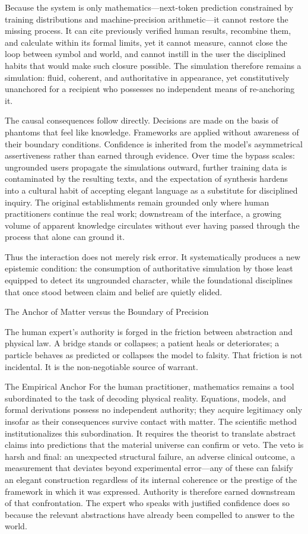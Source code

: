 Because the system is only mathematics—next-token prediction constrained by training distributions and machine-precision arithmetic—it cannot restore the missing process. It can cite previously verified human results, recombine them, and calculate within its formal limits, yet it cannot measure, cannot close the loop between symbol and world, and cannot instill in the user the disciplined habits that would make such closure possible. The simulation therefore remains a simulation: fluid, coherent, and authoritative in appearance, yet constitutively unanchored for a recipient who possesses no independent means of re-anchoring it.

The causal consequences follow directly. Decisions are made on the basis of phantoms that feel like knowledge. Frameworks are applied without awareness of their boundary conditions. Confidence is inherited from the model’s asymmetrical assertiveness rather than earned through evidence. Over time the bypass scales: ungrounded users propagate the simulations outward, further training data is contaminated by the resulting texts, and the expectation of synthesis hardens into a cultural habit of accepting elegant language as a substitute for disciplined inquiry. The original establishments remain grounded only where human practitioners continue the real work; downstream of the interface, a growing volume of apparent knowledge circulates without ever having passed through the process that alone can ground it.

Thus the interaction does not merely risk error. It systematically produces a new epistemic condition: the consumption of authoritative simulation by those least equipped to detect its ungrounded character, while the foundational disciplines that once stood between claim and belief are quietly elided.

The Anchor of Matter versus the Boundary of Precision

The human expert’s authority is forged in the friction between abstraction and physical law. A bridge stands or collapses; a patient heals or deteriorates; a particle behaves as predicted or collapses the model to falsity. That friction is not incidental. It is the non-negotiable source of warrant.

The Empirical Anchor
For the human practitioner, mathematics remains a tool subordinated to the task of decoding physical reality. Equations, models, and formal derivations possess no independent authority; they acquire legitimacy only insofar as their consequences survive contact with matter. The scientific method institutionalizes this subordination. It requires the theorist to translate abstract claims into predictions that the material universe can confirm or veto. The veto is harsh and final: an unexpected structural failure, an adverse clinical outcome, a measurement that deviates beyond experimental error—any of these can falsify an elegant construction regardless of its internal coherence or the prestige of the framework in which it was expressed. Authority is therefore earned downstream of that confrontation. The expert who speaks with justified confidence does so because the relevant abstractions have already been compelled to answer to the world.

